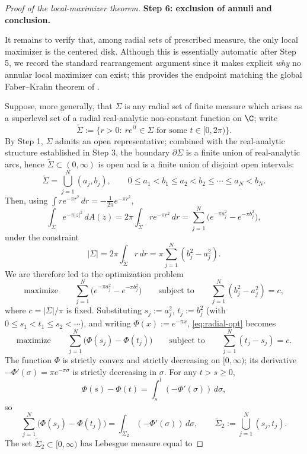 \begin{proof}[Proof of the local-maximizer theorem]
\medskip
\noindent
{\bf Step 6: exclusion of annuli and conclusion.}

It remains to verify that, among radial sets of prescribed measure, the only
local maximizer is the centered disk. Although this is essentially automatic
after Step 5, we record the standard rearrangement argument since it makes
explicit \emph{why} no annular local maximizer can exist; this provides the
endpoint matching the global Faber--Krahn theorem of \cite{Nicola-Tilli}.

Suppose, more generally, that \(\Sigma\) is any radial set of finite measure
which arises as a superlevel set of a radial real-analytic non-constant
function on \(\C\); write
\[
\widetilde \Sigma:=\{r>0:\ re^{it}\in \Sigma \text{ for some } t\in [0,2\pi)\}.
\]
By Step 1, \(\Sigma\) admits an open representative; combined with the
real-analytic structure established in Step 3, the boundary
\(\partial\Sigma\) is a finite union of real-analytic arcs, hence
\(\widetilde \Sigma\subset (0,\infty)\) is open and is a finite union of
disjoint open intervals:
\[
\widetilde \Sigma=\bigcup_{j=1}^N (a_j,b_j),
\qquad
0\le a_1<b_1\le a_2<b_2\le \cdots\le a_N<b_N.
\]
Then, using \(\int re^{-\pi r^2}\,dr=-\frac{1}{2\pi}e^{-\pi r^2}\),
\[
\int_\Sigma e^{-\pi |z|^2}\,dA(z)
=
2\pi \int_{\widetilde \Sigma} r e^{-\pi r^2}\,dr
=
\sum_{j=1}^N \big(e^{-\pi a_j^2}-e^{-\pi b_j^2}\big),
\]
under the constraint
\[
|\Sigma|
=
2\pi \int_{\widetilde \Sigma} r\,dr
=
\pi \sum_{j=1}^N (b_j^2-a_j^2).
\]
We are therefore led to the optimization problem
\begin{equation}\label{eq:radial-opt}
\text{maximize}\qquad
\sum_{j=1}^N \big(e^{-\pi a_j^2}-e^{-\pi b_j^2}\big)
\qquad \text{subject to}\qquad
\sum_{j=1}^N (b_j^2-a_j^2)=c,
\end{equation}
where \(c=|\Sigma|/\pi\) is fixed. Substituting \(s_j:=a_j^2\),
\(t_j:=b_j^2\) (with \(0\le s_1<t_1\le s_2<\cdots\)), and writing
\(\Phi(x):=e^{-\pi x}\), \eqref{eq:radial-opt} becomes
\[
\text{maximize}\qquad
\sum_{j=1}^N \big(\Phi(s_j)-\Phi(t_j)\big)
\qquad \text{subject to}\qquad
\sum_{j=1}^N (t_j-s_j)=c.
\]
The function \(\Phi\) is strictly convex and strictly decreasing on
\([0,\infty)\); its derivative \(-\Phi'(\sigma)=\pi e^{-\pi\sigma}\) is strictly
decreasing in \(\sigma\). For any \(t>s\ge 0\),
\[
\Phi(s)-\Phi(t)
=
\int_s^t (-\Phi'(\sigma))\,d\sigma,
\]
so
\[
\sum_{j=1}^N\big(\Phi(s_j)-\Phi(t_j)\big)
=
\int_{\widetilde\Sigma_2}(-\Phi'(\sigma))\,d\sigma,
\qquad
\widetilde\Sigma_2:=\bigcup_{j=1}^N (s_j,t_j).
\]
The set \(\widetilde\Sigma_2\subset[0,\infty)\) has Lebesgue measure equal to

\end{proof}
